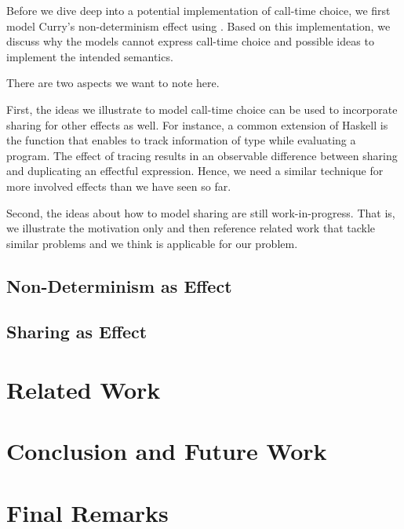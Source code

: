 Before we dive deep into a potential implementation of call-time
choice, we first model Curry's non-determinism effect using
.
Based on this implementation, we discuss why the models cannot express
call-time choice and possible ideas to implement the intended semantics.

There are two aspects we want to note here.

First, the ideas we illustrate to model call-time choice can be used
to incorporate sharing for other effects as well.
For instance, a common extension of Haskell is the function
 that enables to track information of type 
while evaluating a program.
The effect of tracing results in an observable difference between
sharing and duplicating an effectful expression.
Hence, we need a similar technique for more involved effects than we
have seen so far.

Second, the ideas about how to model sharing are still
work-in-progress.
That is, we illustrate the motivation only and then reference related work that
tackle similar problems and we think is applicable for our problem.

\subsection{Non-Determinism as Effect}
\subsection{Sharing as Effect}

\section{Related Work}
\section{Conclusion and Future Work}

\section{Final Remarks}
